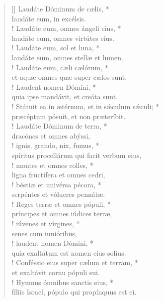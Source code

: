 \begin{verse}[\versewidth]
Laudáte Dóminum de cælis, *\\
laudáte eum, in excélsis.\\!
\vin Laudáte eum, omnes ángeli eius, *\\
\vin laudáte eum, omnes virtútes eius.\\!
Laudáte eum, sol et luna, *\\
laudáte eum, omnes stellæ et lumen.\\!
\vin Laudáte eum, cæli cælórum, *\\
\vin et aquæ omnes quæ super cælos sunt.\\!
Laudent nomen Dómini, *\\
quia ipse mandávit, et creáta sunt.\\!
\vin Státuit ea in ætérnum, et in s\'{æ}culum s\'{æ}culi; *\\
\vin præcéptum pósuit, et non præteríbit.\\!
Laudáte Dóminum de terra, *\\
dracónes et omnes abýssi,\\!
\vin ignis, grando, nix, fumus, *\\
\vin spíritus procellárum qui facit verbum eius,\\!
montes et omnes colles, *\\
ligna fructífera et omnes cedri,\\!
\vin béstiæ et univérsa pécora, *\\
\vin serpéntes et vólucres pennátæ.\\!
Reges terræ et omnes pópuli, *\\
príncipes et omnes iúdices terræ,\\!
\vin iúvenes et vírgines, *\\
\vin senes cum iunióribus,\\!
laudent nomen Dómini, *\\
quia exaltátum est nomen eius solíus.\\!
\vin Conféssio eius super cælum et terram, *\\
\vin et exaltávit cornu pópuli sui.\\!
Hymnus ómnibus sanctis eius, *\\
fíliis Israel, pópulo qui propínquus est ei.\\
\end{verse}
\vspace{1cm}



